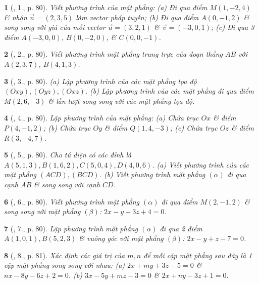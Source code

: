 \documentclass{article}
\newtheorem{baitoan}{}
\begin{document}
\begin{baitoan}[\cite{SGK_Toan_12_hinh_hoc_co_ban}, 1., p. 80]
	Viết phương trình của mặt phẳng: (a) Đi qua điểm $M(1,-2,4)$ \& nhận $\vec{n} = (2,3,5)$ làm vector pháp tuyến; (b) Đi qua điểm $A(0,-1,2)$ \& song song với giá của mỗi vector $\vec{u} = (3,2,1)$ \& $\vec{v} = (-3,0,1)$; (c) Đi qua 3 điểm $A(-3,0,0)$, $B(0,-2,0)$, \& $C(0,0,-1)$.
\end{baitoan}

\begin{baitoan}[\cite{SGK_Toan_12_hinh_hoc_co_ban}, 2., p. 80]
	Viết phương trình mặt phẳng trung trực của đoạn thẳng $AB$ với $A(2,3,7)$, $B(4,1,3)$.
\end{baitoan}

\begin{baitoan}[\cite{SGK_Toan_12_hinh_hoc_co_ban}, 3., p. 80]
	(a) Lập phương trình của các mặt phẳng tọa độ $(Oxy),(Oyz),(Oxz)$. (b) Lập phương trình của các mặt phẳng đi qua điểm $M(2,6,-3)$ \& lần lượt song song với các mặt phẳng tọa độ.
\end{baitoan}

\begin{baitoan}[\cite{SGK_Toan_12_hinh_hoc_co_ban}, 4., p. 80]
	Lập phương trình của mặt phẳng: (a) Chứa trục $Ox$ \& điểm $P(4,-1,2)$; (b) Chứa trục $Oy$ \& điểm $Q(1,4,-3)$; (c) Chứa trục $Oz$ \& điểm $R(3,-4,7)$.
\end{baitoan}

\begin{baitoan}[\cite{SGK_Toan_12_hinh_hoc_co_ban}, 5., p. 80]
	Cho tứ diện có các đỉnh là $A(5,1,3),B(1,6,2),C(5,0,4),D(4,0,6)$. (a) Viết phương trình của các mặt phẳng $(ACD),(BCD)$. (b) Viết phương trình mặt phẳng $(\alpha)$ đi qua cạnh $AB$ \& song song với cạnh $CD$.
\end{baitoan}

\begin{baitoan}[\cite{SGK_Toan_12_hinh_hoc_co_ban}, 6., p. 80]
	Viết phương trình mặt phẳng $(\alpha)$ đi qua điểm $M(2,-1,2)$ \& song song với mặt phẳng $(\beta)$: $2x - y + 3z + 4 = 0$.
\end{baitoan}

\begin{baitoan}[\cite{SGK_Toan_12_hinh_hoc_co_ban}, 7., p. 80]
	Lập phương trình mặt phẳng $(\alpha)$ đi qua 2 điểm $A(1,0,1),B(5,2,3)$ \& vuông góc với mặt phẳng $(\beta)$: $2x - y + z - 7 = 0$.
\end{baitoan}

\begin{baitoan}[\cite{SGK_Toan_12_hinh_hoc_co_ban}, 8., p. 81]
	Xác định các giá trị của $m,n$ để mỗi cặp mặt phẳng sau đây là 1 cặp mặt phẳng song song với nhau: (a) $2x + my + 3z - 5 = 0$ \& $nx - 8y - 6z + 2 = 0$. (b) $3x - 5y + mz - 3 = 0$ \& $2x + ny - 3z + 1 = 0$.
\end{baitoan}
\end{document}
